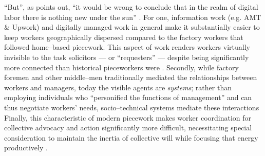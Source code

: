 \documentclass{sigchi}
\newcommand{\msb}[1]{{\color{PineGreen}[MSB: #1]}}
\begin{document}
``But'',
as \citeauthor{scholz2012digital} points out,
``it would be wrong to conclude that
in the realm of digital labor there is nothing new under the sun''
\cite{scholz2012digital}.
For one, information work
(e.g. AMT \& Upwork)
and digitally managed work in general make it substantially easier
to keep workers geographically dispersed
compared to the factory workers that followed home--based piecework.
This aspect of work renders workers virtually invisible to the task solicitors
--- or ``requesters'' ---
despite being significantly more connected than historical pieceworkers were %
\cite{turkopticon}.
Secondly, while
factory foremen and other middle--men
traditionally mediated the relationships between workers and managers,
today the visible agents are \textit{systems};
rather than employing individuals who ``personified the functions of management''
and can thus negotiate workers' needs,
socio--technical systems mediate these interactions %
\cite{wray1949marginal}
Finally, this characteristic of modern piecework makes
worker coordination for collective advocacy and action significantly more difficult,
necessitating special consideration to maintain the inertia of collective will
while focusing that energy productively
\cite{dynamo}.

\end{document}
